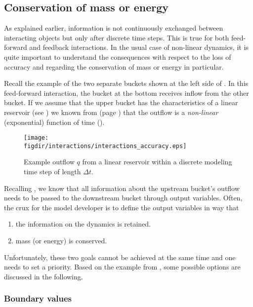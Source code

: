 \subsection{Conservation of mass or energy}

As explained earlier, information is not continuously exchanged between interacting objects but only after discrete time steps. This is true for both feed-forward and feedback interactions. In the usual case of non-linear dynamics, it is quite important to understand the consequences with respect to the loss of accuracy and regarding the conservation of mass or energy in particular.

Recall the example of the two separate buckets shown at the left side of . In this feed-forward interaction, the bucket at the bottom receives inflow from the other bucket. If we assume that the upper bucket has the characteristics of a linear reservoir (see ) we known from  (page \pageref{eqn:concept-classDef-linReserv-solution-q}) that the outflow is a \emph{non-linear} (exponential) function of time ().

\begin{figure}
  \centering
  \texttt{[image: \\figdir/interactions/interactions\_accuracy.eps]}
  \caption{Example outflow $q$ from a linear reservoir within a discrete modeling time step of length $\Delta t$. \label{fig:concept-interactions-accuracy}}
\end{figure}

Recalling , we know that all information about the upstream bucket's outflow needs to be passed to the downstream bucket through output variables. Often, the crux for the model developer is to define the output variables in way that
\begin{enumerate}
  \item the information on the dynamics is retained.
  \item mass (or energy) is conserved.
\end{enumerate}

Unfortunately, these two goals cannot be achieved at the same time and one needs to set a priority. Based on the example from , some possible options are discussed in the following.

\subsubsection*{Boundary values}

